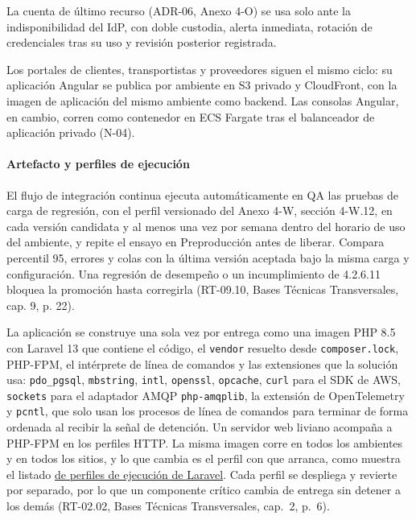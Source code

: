 La cuenta de último recurso (ADR-06, Anexo 4-O) se usa solo ante la indisponibilidad del IdP, con doble custodia, alerta inmediata, rotación de credenciales tras su uso y revisión posterior registrada.

Los portales de clientes, transportistas y proveedores siguen el mismo ciclo: su aplicación Angular se publica por ambiente en S3 privado y CloudFront, con la imagen de aplicación del mismo ambiente como backend. Las consolas Angular, en cambio, corren como contenedor en ECS Fargate tras el balanceador de aplicación privado (N-04).

\paragraph{Artefacto y perfiles de ejecución}

El flujo de integración continua ejecuta automáticamente en QA las pruebas de carga de regresión, con el perfil versionado del Anexo 4-W, sección 4-W.12, en cada versión candidata y al menos una vez por semana dentro del horario de uso del ambiente, y repite el ensayo en Preproducción antes de liberar. Compara percentil 95, errores y colas con la última versión aceptada bajo la misma carga y configuración. Una regresión de desempeño o un incumplimiento de 4.2.6.11 bloquea la promoción hasta corregirla (RT-09.10, Bases Técnicas Transversales, cap. 9, p. 22).

La aplicación se construye una sola vez por entrega como una imagen PHP 8.5 con Laravel 13 que contiene el código, el \texttt{vendor} resuelto desde \texttt{composer.lock}, PHP-FPM, el intérprete de línea de comandos y las extensiones que la solución usa: \texttt{pdo\_pgsql}, \texttt{mbstring}, \texttt{intl}, \texttt{openssl}, \texttt{opcache}, \texttt{curl} para el SDK de AWS, \texttt{sockets} para el adaptador AMQP \texttt{php-amqplib}, la extensión de OpenTelemetry y \texttt{pcntl}, que solo usan los procesos de línea de comandos para terminar de forma ordenada al recibir la señal de detención. Un servidor web liviano acompaña a PHP-FPM en los perfiles HTTP. La misma imagen corre en todos los ambientes y en todos los sitios, y lo que cambia es el perfil con que arranca, como muestra el listado \hyperref[tab:perfiles]{de perfiles de ejecución de Laravel}. Cada perfil se despliega y revierte por separado, por lo que un componente crítico cambia de entrega sin detener a los demás (RT-02.02, Bases Técnicas Transversales, cap.~2, p.~6).

